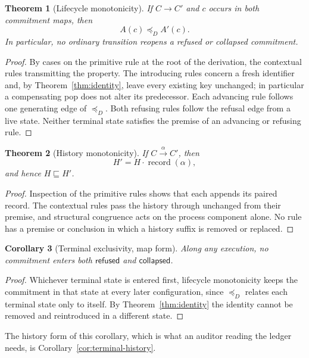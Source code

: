 \documentclass[11pt,openany]{book}
\newtheorem{theorem}{Theorem}[chapter]
\newtheorem{corollary}[theorem]{Corollary}
\theoremstyle{remark}
\newcommand{\record}{\operatorname{record}}
\begin{document}
\begin{theorem}[Lifecycle monotonicity]
If $C\to C'$ and $c$ occurs in both commitment maps, then
\[
  A(c)\preceq_D A'(c).
\]
In particular, no ordinary transition reopens a refused or collapsed
commitment.
\end{theorem}

\begin{proof}
By cases on the primitive rule at the root of the derivation, the
contextual rules transmitting the property. The introducing rules concern
a fresh identifier and, by Theorem~\ref{thm:identity}, leave every existing
key unchanged; in particular a compensating pop does not alter its
predecessor. Each advancing rule follows one generating edge of
$\preceq_D$. Both refusing rules follow the refusal edge from a live
state. Neither terminal state satisfies the premise of an advancing or
refusing rule.
\end{proof}

\begin{theorem}[History monotonicity]
If $C\xrightarrow{\alpha}C'$, then
\[
  H'=H\cdot\record(\alpha),
\]
and hence $H\sqsubseteq H'$.
\end{theorem}

\begin{proof}
Inspection of the primitive rules shows that each appends its paired
record. The contextual rules pass the history through unchanged from their
premise, and structural congruence acts on the process component alone. No
rule has a premise or conclusion in which a history suffix is removed or
replaced.
\end{proof}

\begin{corollary}[Terminal exclusivity, map form]
Along any execution, no commitment enters both $\mathsf{refused}$ and
$\mathsf{collapsed}$.
\end{corollary}

\begin{proof}
Whichever terminal state is entered first, lifecycle monotonicity keeps
the commitment in that state at every later configuration, since
$\preceq_D$ relates each terminal state only to itself. By
Theorem~\ref{thm:identity} the identity cannot be removed and
reintroduced in a different state.
\end{proof}

The history form of this corollary, which is what an auditor reading the
ledger needs, is Corollary~\ref{cor:terminal-history}.
\end{document}
